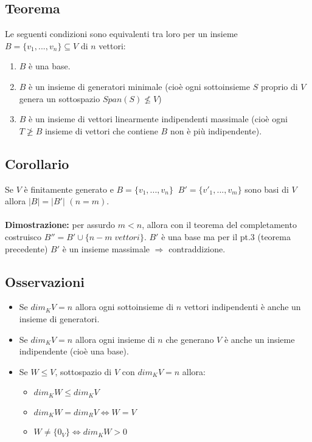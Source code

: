  \subsection{Teorema}
 Le seguenti condizioni sono equivalenti tra loro per un insieme $B=\{v_1,...,v_n\}\subseteq V$ di $n$ vettori:
 \begin{enumerate}
 	\item $B$ è una base.
 	\item $B$ è un insieme di generatori minimale (cioè ogni sottoinsieme $S$ proprio di $V$ genera un sottospazio $Span(S)\not\leq V$)
 	\item $B$ è un insieme di vettori linearmente indipendenti massimale (cioè ogni $T\not\geq B$ insieme di vettori che contiene $B$ non è più indipendente).
 \end{enumerate}

 \subsection{Corollario}
 Se $V$ è finitamente generato e $B=\{v_1,...,v_n\}\;\;B'=\{v'_1,...,v_m\}$ sono basi di $V$ allora $|B|=|B'|$ $(n=m)$.
 \\
 \\\textbf{Dimostrazione:} per assurdo $m<n$, allora con il teorema del completamento costruisco $B''=B'\cup\{n-m\;vettori\}$. $B'$ è una base ma per il pt.3 (teorema precedente) $B'$ è un insieme massimale $\Rightarrow$ contraddizione.

\subsection{Osservazioni}
\begin{itemize}
	\item Se $dim_KV=n$ allora ogni sottoinsieme di $n$ vettori indipendenti è anche un insieme di generatori.
	\item Se $dim_KV=n$ allora ogni insieme di $n$ che generano $V$ è anche un insieme indipendente (cioè una base).
	\item Se $W\leq V$, sottospazio di $V$ con $dim_KV=n$ allora:
	\begin{itemize}
		\item $dim_KW\leq dim_KV$
		\item $dim_KW=dim_RV\Leftrightarrow W=V$
		\item $W\neq\{0_V\}\Leftrightarrow dim_KW>0$
	\end{itemize}
\end{itemize}

